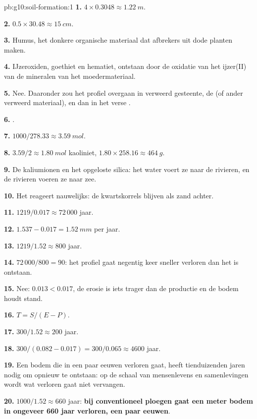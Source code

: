 \begin{solution}{pb:g10:soil-formation:1}
\textbf{1.} $4 \times 0.3048 \approx \qty{1.22}{m}$.

\textbf{2.} $0.5 \times 30.48 \approx \qty{15}{cm}$.

\textbf{3.} Humus, het donkere organische materiaal dat afbrekers uit dode
planten maken.

\textbf{4.} IJzeroxiden, goethiet en hematiet, ontstaan door de oxidatie van het
ijzer(II) van de mineralen van het moedermateriaal.

\textbf{5.} Nee. Daaronder zou het profiel overgaan in verweerd gesteente, de
 (of ander verweerd materiaal), en dan in het verse .

\textbf{6.} .

\textbf{7.} $1000/278.33 \approx \qty{3.59}{mol}$.

\textbf{8.} $3.59/2 \approx \qty{1.80}{mol}$ kaoliniet, $1.80 \times 258.16
\approx \qty{464}{g}$.

\textbf{9.} De kaliumionen en het opgeloste silica: het water voert ze naar de
rivieren, en de rivieren voeren ze naar zee.

\textbf{10.} Het reageert nauwelijks: de kwartskorrels blijven als zand achter.

\textbf{11.} $1219/0.017 \approx 72\,000$ jaar.

\textbf{12.} $1.537 - 0.017 = \qty{1.52}{mm}$ per jaar.

\textbf{13.} $1219/1.52 \approx 800$ jaar.

\textbf{14.} $72\,000/800 = 90$: het profiel gaat negentig keer sneller verloren
dan het is ontstaan.

\textbf{15.} Nee: $0.013 < 0.017$, de erosie is iets trager dan de productie en
de bodem houdt stand.

\textbf{16.} $T = S/(E - P)$.

\textbf{17.} $300/1.52 \approx 200$ jaar.

\textbf{18.} $300/(0.082 - 0.017) = 300/0.065 \approx 4600$ jaar.

\textbf{19.} Een bodem die in een paar eeuwen verloren gaat, heeft tienduizenden
jaren nodig om opnieuw te ontstaan: op de schaal van mensenlevens en
samenlevingen wordt wat verloren gaat niet vervangen.

\textbf{20.} $1000/1.52 \approx 660$ jaar: \textbf{bij conventioneel ploegen gaat
een meter bodem in ongeveer 660 jaar verloren, een paar eeuwen}.
\end{solution}
